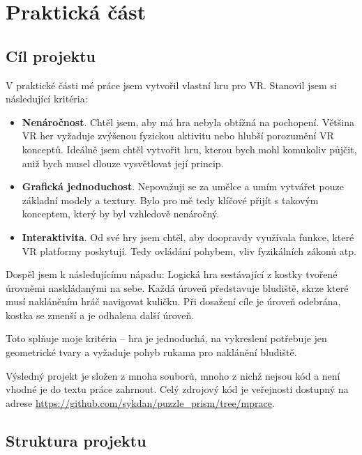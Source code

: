 \part{Praktická část}

\chapter{Cíl projektu}

V praktické části mé práce jsem vytvořil vlastní hru pro VR. Stanovil jsem si následující kritéria:

\begin{itemize}
  \item \textbf{Nenáročnost}. Chtěl jsem, aby má hra nebyla obtížná na pochopení. Většina VR her vyžaduje zvýšenou fyzickou aktivitu nebo hlubší porozumění VR konceptů. Ideálně jsem chtěl vytvořit hru, kterou bych mohl komukoliv půjčit, aniž bych musel dlouze vysvětlovat její princip.
  \item \textbf{Grafická jednoduchost}. Nepovažuji se za umělce a umím vytvářet pouze základní modely a textury. Bylo pro mě tedy klíčové přijít s takovým konceptem, který by byl vzhledově nenáročný.
  \item \textbf{Interaktivita}. Od své hry jsem chtěl, aby doopravdy využívala funkce, které VR platformy poskytují. Tedy ovládání pohybem, vliv fyzikálních zákonů atp.
\end{itemize}

Dospěl jsem k následujícímu nápadu: Logická hra sestávající z kostky tvořené úrovněmi naskládanými na sebe. Každá úroveň představuje bludiště, skrze které musí nakláněním hráč navigovat kuličku. Při dosažení cíle je úroveň odebrána, kostka se zmenší a je odhalena další úroveň.

Toto splňuje moje kritéria -- hra je jednoduchá, na vykreslení potřebuje jen geometrické tvary a vyžaduje pohyb rukama pro naklánění bludiště.

Výsledný projekt je složen z mnoha souborů, mnoho z nichž nejsou kód a není vhodné je do textu práce zahrnout. Celý zdrojový kód je veřejnosti dostupný na adrese \url{https://github.com/sykdan/puzzle_prism/tree/mprace}. 

\chapter{Struktura projektu}

